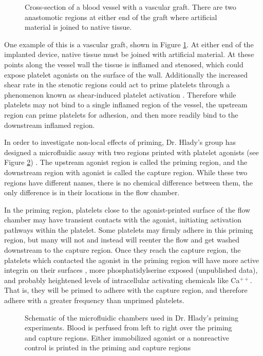 \begin{figure}
  \centering
  
  \caption[Cross-section of a blood vessel with a vascular
  graft]{Cross-section of a blood vessel with a vascular graft. There
    are two anastomotic regions at either end of the graft where
    artificial material is joined to native tissue.}
  \label{fig:blood-vessel}
\end{figure}

One example of this is a vascular graft, shown in Figure
\ref{fig:blood-vessel}. At either end of the implanted device, native
tissue must be joined with artificial material. At these points along
the vessel wall the tissue is inflamed and stenosed, which could
expose platelet agonists on the surface of the wall. Additionally the
increased shear rate in the stenotic regions could act to prime
platelets through a phenomenon known as shear-induced platelet
activation \cite{Fogelson2015,Kroll96,Shankaran2003}. Therefore while
platelets may not bind to a single inflamed region of the vessel, the
upstream region can prime platelets for adhesion, and then more
readily bind to the downstream inflamed region.

In order to investigate non-local effects of priming, Dr. Hlady's
group has designed a microfluidic assay with two regions printed with
platelet agonists (see Figure \ref{fig:flow-chamber})
\cite{Corum2012}. The upstream agonist region is called the priming
region, and the downstream region with agonist is called the capture
region. While these two regions have different names, there is no
chemical difference between them, the only difference is in their
locations in the flow chamber.

In the priming region, platelets close to the agonist-printed surface
of the flow chamber may have transient contacts with the agonist,
initiating activation pathways within the platelet. Some platelets may
firmly adhere in this priming region, but many will not and instead
will reenter the flow and get washed downstream to the capture
region. Once they reach the capture region, the platelets which
contacted the agonist in the priming region will have more active
integrin on their surfaces \cite{Corum2012}, more phosphatidylserine
exposed (unpublished data), and probably heightened levels of
intracellular activating chemicals like Ca$^{++}$. That is, they will
be primed to adhere with the capture region, and therefore adhere with
a greater frequency than unprimed platelets.

\begin{figure}
  \centering
  
  \caption[The microfluidic chambers used in Dr. Hlady's priming
  experiments.]{Schematic of the microfluidic chambers used in
    Dr. Hlady's priming experiments. Blood is perfused from left to
    right over the priming and capture regions. Either immobilized
    agonist or a nonreactive control is printed in the priming and
    capture regions}
  \label{fig:flow-chamber}
\end{figure}

